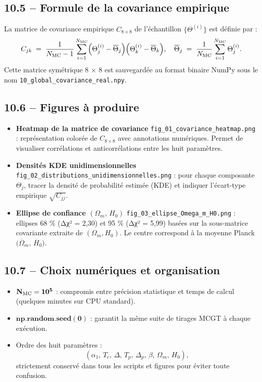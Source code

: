 \subsection{10.5 – Formule de la covariance empirique}
La matrice de covariance empirique \(C_{8\times8}\) de l’échantillon \(\{\Theta^{(i)}\}\) est définie par :
\[
  C_{jk} 
  \;=\; 
  \frac{1}{N_{\rm MC} - 1}
  \sum_{i=1}^{N_{\rm MC}}
    \Bigl(\Theta_{j}^{(i)} - \overline{\Theta}_{j}\Bigr)
    \Bigl(\Theta_{k}^{(i)} - \overline{\Theta}_{k}\Bigr),
  \quad
  \overline{\Theta}_{j} 
  \;=\; 
  \frac{1}{N_{\rm MC}} 
  \sum_{i=1}^{N_{\rm MC}} \Theta_{j}^{(i)}.
\]
Cette matrice symétrique 8 × 8 est sauvegardée au format binaire NumPy sous le nom \texttt{10\_global\_covariance\_real.npy}.

\subsection{10.6 – Figures à produire}

\begin{itemize}
  \item \textbf{Heatmap de la matrice de covariance}  
    \texttt{fig\_01\_covariance\_heatmap.png} :  
    représentation colorée de \(C_{8\times8}\) avec annotations numériques.  
    Permet de visualiser corrélations et anticorrélations entre les huit paramètres.

  \item \textbf{Densités KDE unidimensionnelles}  
    \texttt{fig\_02\_distributions\_unidimensionnelles.png} :  
    pour chaque composante \(\Theta_{j}\), tracer la densité de probabilité estimée (KDE) et indiquer l’écart‐type empirique \(\sqrt{C_{jj}}\).

  \item \textbf{Ellipse de confiance \((\Omega_{m},\,H_{0})\)}  
    \texttt{fig\_03\_ellipse\_Omega\_m\_H0.png} :  
    ellipses 68 \% (Δχ² = 2,30) et 95 \% (Δχ² = 5,99) basées sur la sous‐matrice covariante extraite de \((\Omega_{m},H_{0})\).  
    Le centre correspond à la moyenne Planck \(\bigl(\overline{\Omega}_{m},\,\overline{H}_{0}\bigr)\).

\end{itemize}

\subsection{10.7 – Choix numériques et organisation}

\begin{itemize}
  \item \(\mathbf{N_{\rm MC} = 10^{5}}\) : compromis entre précision statistique et temps de calcul (quelques minutes sur CPU standard).  
  \item \(\mathbf{np.random.seed(0)}\) : garantit la même suite de tirages MCGT à chaque exécution.  
  \item Ordre des huit paramètres :  
    \[
      (\alpha_{1},\,T_{c},\,\Delta,\,T_{p},\,\Delta_{p},\,\beta,\,\Omega_{m},\,H_{0}),
    \]
    strictement conservé dans tous les scripts et figures pour éviter toute confusion.
\end{itemize}

